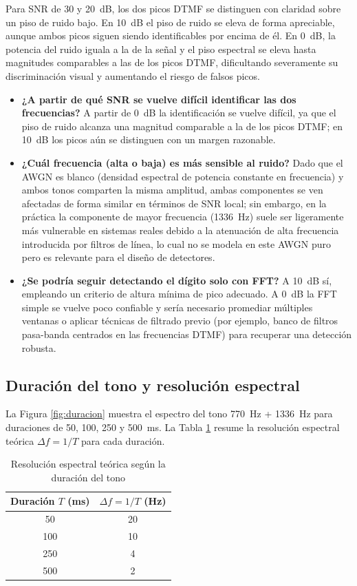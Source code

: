 \documentclass[conference]{IEEEtran}
\begin{document}
Para SNR de 30 y 20~dB, los dos picos DTMF se distinguen con claridad sobre un piso de ruido bajo. En 10~dB el piso de ruido se eleva de forma apreciable, aunque ambos picos siguen siendo identificables por encima de él. En 0~dB, la potencia del ruido iguala a la de la señal y el piso espectral se eleva hasta magnitudes comparables a las de los picos DTMF, dificultando severamente su discriminación visual y aumentando el riesgo de falsos picos.

\begin{itemize}
    \item \textbf{¿A partir de qué SNR se vuelve difícil identificar las dos frecuencias?} A partir de 0~dB la identificación se vuelve difícil, ya que el piso de ruido alcanza una magnitud comparable a la de los picos DTMF; en 10~dB los picos aún se distinguen con un margen razonable.
    \item \textbf{¿Cuál frecuencia (alta o baja) es más sensible al ruido?} Dado que el AWGN es blanco (densidad espectral de potencia constante en frecuencia) y ambos tonos comparten la misma amplitud, ambas componentes se ven afectadas de forma similar en términos de SNR local; sin embargo, en la práctica la componente de mayor frecuencia (1336~Hz) suele ser ligeramente más vulnerable en sistemas reales debido a la atenuación de alta frecuencia introducida por filtros de línea, lo cual no se modela en este AWGN puro pero es relevante para el diseño de detectores.
    \item \textbf{¿Se podría seguir detectando el dígito solo con FFT?} A 10~dB sí, empleando un criterio de altura mínima de pico adecuado. A 0~dB la FFT simple se vuelve poco confiable y sería necesario promediar múltiples ventanas o aplicar técnicas de filtrado previo (por ejemplo, banco de filtros pasa-banda centrados en las frecuencias DTMF) para recuperar una detección robusta.
\end{itemize}

\subsection{Duración del tono y resolución espectral}

La Figura \ref{fig:duracion} muestra el espectro del tono 770~Hz + 1336~Hz para duraciones de 50, 100, 250 y 500~ms. La Tabla \ref{tab:resolucion} resume la resolución espectral teórica $\Delta f = 1/T$ para cada duración.

\begin{table}[!t]
\centering
\caption{Resolución espectral teórica según la duración del tono}
\label{tab:resolucion}
\begin{tabular}{|c|c|}
\hline
\textbf{Duración $T$ (ms)} & \textbf{$\Delta f = 1/T$ (Hz)} \\ \hline
50 & 20 \\ \hline
100 & 10 \\ \hline
250 & 4 \\ \hline
500 & 2 \\ \hline
\end{tabular}
\end{table}
\end{document}
